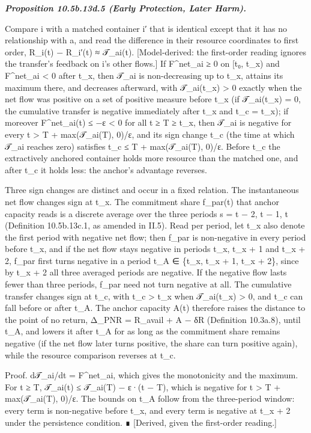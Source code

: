 \documentclass[
]{article}
\begin{document}
\emph{\textbf{Proposition 10.5b.13d.5 (Early Protection, Later Harm).}}

Compare i with a matched container i′ that is identical except that it
has no relationship with a, and read the difference in their resource
coordinates to first order, R\_i(t) − R\_i′(t) ≈ 𝒯\_ai(t).
{[}Model-derived: the first-order reading ignores the transfer's
feedback on i's other flows.{]} If F\^{}net\_ai ≥ 0 on {[}t₀, t\_x) and
F\^{}net\_ai \textless{} 0 after t\_x, then 𝒯\_ai is non-decreasing up
to t\_x, attains its maximum there, and decreases afterward, with
𝒯\_ai(t\_x) \textgreater{} 0 exactly when the net flow was positive on a
set of positive measure before t\_x (if 𝒯\_ai(t\_x) = 0, the cumulative
transfer is negative immediately after t\_x and t\_c = t\_x); if
moreover F\^{}net\_ai(t) ≤ −ε \textless{} 0 for all t ≥ T ≥ t\_x, then
𝒯\_ai is negative for every t \textgreater{} T + max(𝒯\_ai(T), 0)/ε, and
its sign change t\_c (the time at which 𝒯\_ai reaches zero) satisfies
t\_c ≤ T + max(𝒯\_ai(T), 0)/ε. Before t\_c the extractively anchored
container holds more resource than the matched one, and after t\_c it
holds less: the anchor's advantage reverses.

Three sign changes are distinct and occur in a fixed relation. The
instantaneous net flow changes sign at t\_x. The commitment share
f\_par(t) that anchor capacity reads is a discrete average over the
three periods s = t − 2, t − 1, t (Definition 10.5b.13c.1, as amended in
II.5). Read per period, let t\_x also denote the first period with
negative net flow; then f\_par is non-negative in every period before
t\_x, and if the net flow stays negative in periods t\_x, t\_x + 1 and
t\_x + 2, f\_par first turns negative in a period t\_A ∈ \{t\_x, t\_x +
1, t\_x + 2\}, since by t\_x + 2 all three averaged periods are
negative. If the negative flow lasts fewer than three periods, f\_par
need not turn negative at all. The cumulative transfer changes sign at
t\_c, with t\_c \textgreater{} t\_x when 𝒯\_ai(t\_x) \textgreater{} 0,
and t\_c can fall before or after t\_A. The anchor capacity A(t)
therefore raises the distance to the point of no return, Δ\_PNR =
R\_avail + A − δR (Definition 10.3a.8), until t\_A, and lowers it after
t\_A for as long as the commitment share remains negative (if the net
flow later turns positive, the share can turn positive again), while the
resource comparison reverses at t\_c.

Proof. d𝒯\_ai/dt = F\^{}net\_ai, which gives the monotonicity and the
maximum. For t ≥ T, 𝒯\_ai(t) ≤ 𝒯\_ai(T) − ε·(t − T), which is negative
for t \textgreater{} T + max(𝒯\_ai(T), 0)/ε. The bounds on t\_A follow
from the three-period window: every term is non-negative before t\_x,
and every term is negative at t\_x + 2 under the persistence condition.
∎ {[}Derived, given the first-order reading.{]}
\end{document}
